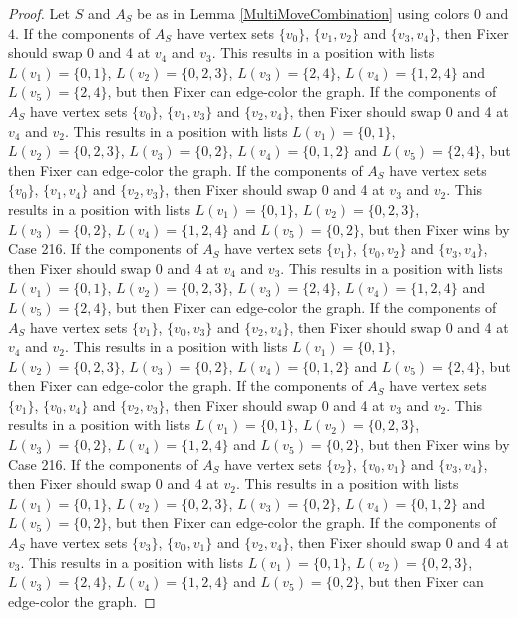 \documentclass[12pt]{amsart}
\theoremstyle{plain}
\theoremstyle{definition}
\theoremstyle{remark}
\begin{document}
\begin{proof}
Let $S$ and $A_S$ be as in Lemma \ref{MultiMoveCombination} using colors $0$ and $4$. If the components of $A_S$ have vertex sets $\{v_0\}$, $\{v_1, v_2\}$ and $\{v_3, v_4\}$, then Fixer should swap 0 and 4 at $v_4$ and $v_3$. This results in a position with lists $L(v_1) = \{0, 1\}$, $L(v_2) = \{0, 2, 3\}$, $L(v_3) = \{2, 4\}$, $L(v_4) = \{1, 2, 4\}$ and $L(v_5) = \{2, 4\}$, but then Fixer can edge-color the graph.
If the components of $A_S$ have vertex sets $\{v_0\}$, $\{v_1, v_3\}$ and $\{v_2, v_4\}$, then Fixer should swap 0 and 4 at $v_4$ and $v_2$. This results in a position with lists $L(v_1) = \{0, 1\}$, $L(v_2) = \{0, 2, 3\}$, $L(v_3) = \{0, 2\}$, $L(v_4) = \{0, 1, 2\}$ and $L(v_5) = \{2, 4\}$, but then Fixer can edge-color the graph.
If the components of $A_S$ have vertex sets $\{v_0\}$, $\{v_1, v_4\}$ and $\{v_2, v_3\}$, then Fixer should swap 0 and 4 at $v_3$ and $v_2$. This results in a position with lists $L(v_1) = \{0, 1\}$, $L(v_2) = \{0, 2, 3\}$, $L(v_3) = \{0, 2\}$, $L(v_4) = \{1, 2, 4\}$ and $L(v_5) = \{0, 2\}$, but then Fixer wins by Case 216.
If the components of $A_S$ have vertex sets $\{v_1\}$, $\{v_0, v_2\}$ and $\{v_3, v_4\}$, then Fixer should swap 0 and 4 at $v_4$ and $v_3$. This results in a position with lists $L(v_1) = \{0, 1\}$, $L(v_2) = \{0, 2, 3\}$, $L(v_3) = \{2, 4\}$, $L(v_4) = \{1, 2, 4\}$ and $L(v_5) = \{2, 4\}$, but then Fixer can edge-color the graph.
If the components of $A_S$ have vertex sets $\{v_1\}$, $\{v_0, v_3\}$ and $\{v_2, v_4\}$, then Fixer should swap 0 and 4 at $v_4$ and $v_2$. This results in a position with lists $L(v_1) = \{0, 1\}$, $L(v_2) = \{0, 2, 3\}$, $L(v_3) = \{0, 2\}$, $L(v_4) = \{0, 1, 2\}$ and $L(v_5) = \{2, 4\}$, but then Fixer can edge-color the graph.
If the components of $A_S$ have vertex sets $\{v_1\}$, $\{v_0, v_4\}$ and $\{v_2, v_3\}$, then Fixer should swap 0 and 4 at $v_3$ and $v_2$. This results in a position with lists $L(v_1) = \{0, 1\}$, $L(v_2) = \{0, 2, 3\}$, $L(v_3) = \{0, 2\}$, $L(v_4) = \{1, 2, 4\}$ and $L(v_5) = \{0, 2\}$, but then Fixer wins by Case 216.
If the components of $A_S$ have vertex sets $\{v_2\}$, $\{v_0, v_1\}$ and $\{v_3, v_4\}$, then Fixer should swap 0 and 4 at $v_2$. This results in a position with lists $L(v_1) = \{0, 1\}$, $L(v_2) = \{0, 2, 3\}$, $L(v_3) = \{0, 2\}$, $L(v_4) = \{0, 1, 2\}$ and $L(v_5) = \{0, 2\}$, but then Fixer can edge-color the graph.
If the components of $A_S$ have vertex sets $\{v_3\}$, $\{v_0, v_1\}$ and $\{v_2, v_4\}$, then Fixer should swap 0 and 4 at $v_3$. This results in a position with lists $L(v_1) = \{0, 1\}$, $L(v_2) = \{0, 2, 3\}$, $L(v_3) = \{2, 4\}$, $L(v_4) = \{1, 2, 4\}$ and $L(v_5) = \{0, 2\}$, but then Fixer can edge-color the graph.

\end{proof}
\end{document}
